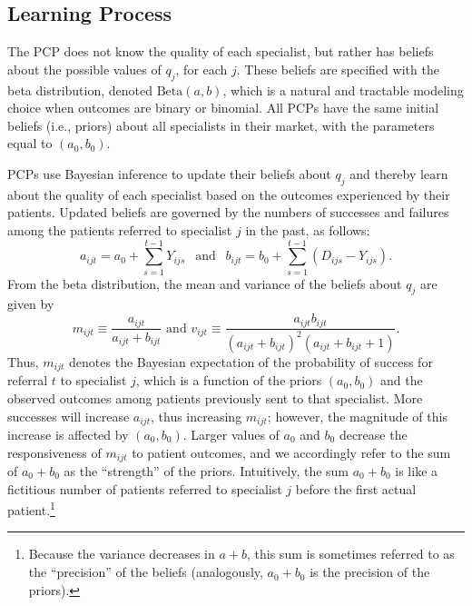 \documentclass[12pt]{article}
\begin{document}
\subsection{Learning Process}
\label{sec:learning}

The PCP does not know the quality of each specialist, but rather has beliefs about the possible values of $q_j$, for each $j$. These beliefs are specified with the beta distribution, denoted $\mathrm{Beta}(a, b)$, which is a natural and tractable modeling choice when outcomes are binary or binomial. All PCPs have the same initial beliefs (i.e., priors) about all specialists in their market, with the parameters equal to $(a_0, b_0)$.

PCPs use Bayesian inference to update their beliefs about $q_j$ and thereby learn about the quality of each specialist based on the outcomes experienced by their patients. Updated beliefs are governed by the numbers of successes and failures among the patients referred to specialist $j$ in the past, as follows:
\begin{equation*}
a_{ijt} = a_0 + \sum_{s=1}^{t-1} Y_{ijs} \ \ \text{ and } \ \ b_{ijt} = b_0 + \sum_{s=1}^{t-1} (D_{ijs} - Y_{ijs}).
\end{equation*}
From the beta distribution, the mean and variance of the beliefs about $q_j$ are given by
\begin{equation}
m_{ijt} \equiv \frac{ a_{ijt} }{ a_{ijt} + b_{ijt} } \text{ and }
v_{ijt} \equiv \frac{ a_{ijt} b_{ijt} }{ (a_{ijt} + b_{ijt})^2 (a_{ijt} + b_{ijt} + 1) } . \label{eqn:mean_var}
\end{equation}
Thus, $m_{ijt}$ denotes the Bayesian expectation of the probability of success for referral $t$ to specialist $j$, which is a function of the priors $(a_0, b_0)$ and the observed outcomes among patients previously sent to that specialist. More successes will increase $a_{ijt}$, thus increasing $m_{ijt}$; however, the magnitude of this increase is affected by $(a_{0},b_{0})$. Larger values of $a_0$ and $b_0$ decrease the responsiveness of $m_{ijt}$ to patient outcomes, and we accordingly refer to the sum of $a_0 + b_0$ as the ``strength'' of the priors. Intuitively, the sum $a_0 + b_0$ is like a fictitious number of patients referred to specialist $j$ before the first actual patient.\footnote{Because the variance decreases in $a + b$, this sum is sometimes referred to as the ``precision'' of the beliefs (analogously, $a_0 + b_0$ is the precision of the priors).}
\end{document}
